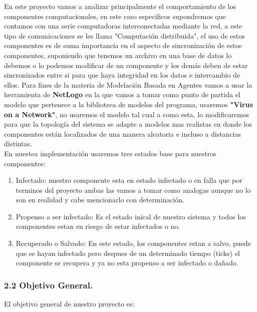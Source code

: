 \documentclass[12pt]{article}
\begin{document}
En este proyecto vamos a analizar principalmente el comportamiento de los componentes computacionales, en este caso especificos supondremos que contamos con una serie computadoras interconectadas mediante la red, a este tipo de comunicaciones se les llama "Computación distribuida", el uso de estos componentes es de suma importancia en el aspecto de 
sincronización de estos componentes, suponiendo que tenemos un archivo en una base de datos lo debemos o lo podemos modificar de un componente y los demás deben de estar sincronizados entre si para que haya integridad en los datos e intercambio de ellos.
Para fines de la materia de Modelación Basada en Agentes vamos a usar la herramienta de \textbf{NetLogo} en la que vamos a tomar como punto de partida el modelo que pertenece a la biblioteca de modelos del programa, usaremos \textbf{"Virus on a
Network"}, no usaremos el modelo tal cual a como esta, lo modificaremos para que la topología del sistema se adapte a modelos mas realistas en donde los componentes están localizados de una manera aleatoria e incluso a distancias distintas.\\
En nuestea implementación usaremos tres estados base para nuestros componentes:\\
\begin{enumerate}
    \item Infectado: nuestro componente esta en estado infectado o en falla que por terminos del proyecto ambas las vamos a tomar como analogas aunque no lo son en realidad y cabe mencionarlo con determinación.
    \item Propenso a ser infectado: Es el estado inical de nuestro sistema y todos los componentes estan en riesgo de estar infectados o no.
    \item Recuperado o Salvado: En este estado, los componentes estan a salvo, puede que se hayan infectado pero despues de un determinado tiempo (ticks) el componente se recupera y ya no esta propenso a ser infectado o dañado. 
\end{enumerate}



{\color{red} \subsubsection*{2.2 Objetivo General.}}
\vspace{1em}

El objetivo general de nuestro proyecto es:\\
\end{document}
